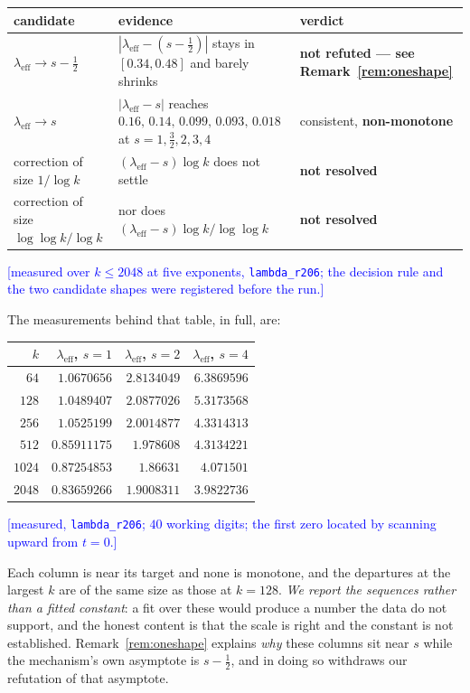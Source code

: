\documentclass[11pt,a4paper]{article}
\theoremstyle{plain}
\theoremstyle{definition}
\theoremstyle{remark}
\newcommand{\STATUS}[1]{\textcolor{blue}{\textsf{[#1]}}}
\begin{document}
\begin{center}
\begin{tabular}{lll}
\toprule
candidate & evidence & verdict\\
\midrule
$\lambda_{\mathrm{eff}}\to s-\tfrac12$ & $|\lambda_{\mathrm{eff}}-(s-\tfrac12)|$ stays
  in $[0.34,0.48]$ and barely shrinks & \textbf{not refuted --- see
  Remark~\ref{rem:oneshape}}\\
$\lambda_{\mathrm{eff}}\to s$ & $|\lambda_{\mathrm{eff}}-s|$ reaches
  $0.16,\,0.14,\,0.099,\,0.093,\,0.018$ at $s=1,\tfrac32,2,3,4$ & consistent,
  \textbf{non-monotone}\\
correction of size $1/\log k$ & $(\lambda_{\mathrm{eff}}-s)\log k$ does not settle
  & \textbf{not resolved}\\
correction of size $\log\log k/\log k$ & nor does
  $(\lambda_{\mathrm{eff}}-s)\log k/\log\log k$ & \textbf{not resolved}\\
\bottomrule
\end{tabular}
\end{center}

\STATUS{measured over $k\le2048$ at five exponents, \texttt{lambda\_r206}; the decision
rule and the two candidate shapes were registered before the run.}

The measurements behind that table, in full, are:

\begin{center}
\begin{tabular}{rrrr}
\toprule
$k$ & $\lambda_{\mathrm{eff}}$, $s=1$ & $\lambda_{\mathrm{eff}}$, $s=2$
    & $\lambda_{\mathrm{eff}}$, $s=4$\\
\midrule
$64$   & $1.0670656$  & $2.8134049$ & $6.3869596$\\
$128$  & $1.0489407$  & $2.0877026$ & $5.3173568$\\
$256$  & $1.0525199$  & $2.0014877$ & $4.3314313$\\
$512$  & $0.85911175$ & $1.978608$  & $4.3134221$\\
$1024$ & $0.87254853$ & $1.86631$   & $4.071501$\\
$2048$ & $0.83659266$ & $1.9008311$ & $3.9822736$\\
\bottomrule
\end{tabular}
\end{center}

\STATUS{measured, \texttt{lambda\_r206}; $40$ working digits; the first zero located by
scanning upward from $t=0$.}

Each column is near its target and none is monotone, and the departures at the largest
$k$ are of the same size as those at $k=128$. \emph{We report the sequences rather than
a fitted constant}: a fit over these would produce a number the data do not support, and
the honest content is that the scale is right and the constant is not established.
Remark~\ref{rem:oneshape} explains \emph{why} these columns sit near $s$ while the
mechanism's own asymptote is $s-\tfrac12$, and in doing so withdraws our refutation of
that asymptote.
\end{document}
